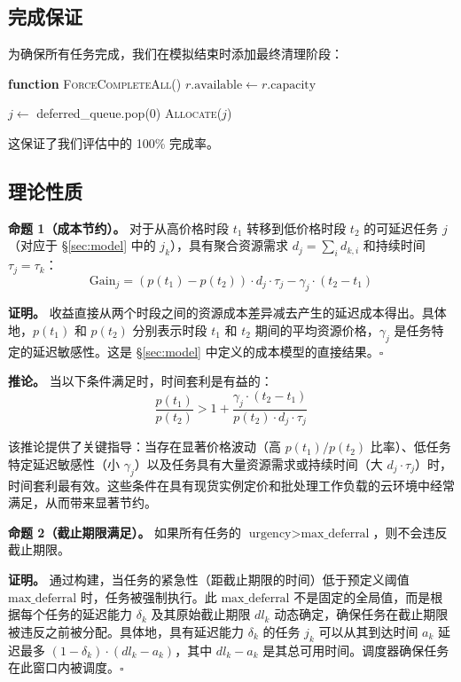 \documentclass[10pt,a4paper]{article}
\begin{document}
\subsection{完成保证}

为确保所有任务完成，我们在模拟结束时添加最终清理阶段：
\begin{algorithmic}[1]
\State \textbf{function} \textsc{ForceCompleteAll}()
\State {}
    \State $r.\text{available} \gets r.\text{capacity}$
\EndFor

\State {}
    \State $j \gets$ deferred\_queue.pop(0)
    \State \textsc{Allocate}($j$)
\EndWhile
\end{algorithmic}

这保证了我们评估中的 100\% 完成率。

\subsection{理论性质}

\textbf{命题 1（成本节约）。} 对于从高价格时段 $t_1$ 转移到低价格时段 $t_2$ 的可延迟任务 $j$（对应于 \S\ref{sec:model} 中的 $j_k$），具有聚合资源需求 $d_j = \sum_i d_{k,i}$ 和持续时间 $\tau_j = \tau_k$：
\begin{equation}
\text{Gain}_j = (p(t_1) - p(t_2)) \cdot d_j \cdot \tau_j - \gamma_j \cdot (t_2 - t_1)
\end{equation}

\textbf{证明。} 收益直接从两个时段之间的资源成本差异减去产生的延迟成本得出。具体地，$p(t_1)$ 和 $p(t_2)$ 分别表示时段 $t_1$ 和 $t_2$ 期间的平均资源价格，$\gamma_j$ 是任务特定的延迟敏感性。这是 \S\ref{sec:model} 中定义的成本模型的直接结果。$\square$

\textbf{推论。} 当以下条件满足时，时间套利是有益的：
\begin{equation}
\frac{p(t_1)}{p(t_2)} > 1 + \frac{\gamma_j \cdot (t_2 - t_1)}{p(t_2) \cdot d_j \cdot \tau_j}
\end{equation}

该推论提供了关键指导：当存在显著价格波动（高 $p(t_1)/p(t_2)$ 比率）、低任务特定延迟敏感性（小 $\gamma_j$）以及任务具有大量资源需求或持续时间（大 $d_j \cdot \tau_j$）时，时间套利最有效。这些条件在具有现货实例定价和批处理工作负载的云环境中经常满足，从而带来显著节约。

\textbf{命题 2（截止期限满足）。} 如果所有任务的 $\text{urgency} > \text{max\_deferral}$，则不会违反截止期限。

\textbf{证明。} 通过构建，当任务的紧急性（距截止期限的时间）低于预定义阈值 $\text{max\_deferral}$ 时，任务被强制执行。此 $\text{max\_deferral}$ 不是固定的全局值，而是根据每个任务的延迟能力 $\delta_k$ 及其原始截止期限 $dl_k$ 动态确定，确保任务在截止期限被违反之前被分配。具体地，具有延迟能力 $\delta_k$ 的任务 $j_k$ 可以从其到达时间 $a_k$ 延迟最多 $(1 - \delta_k) \cdot (dl_k - a_k)$，其中 $dl_k - a_k$ 是其总可用时间。调度器确保任务在此窗口内被调度。$\square$
\end{document}
